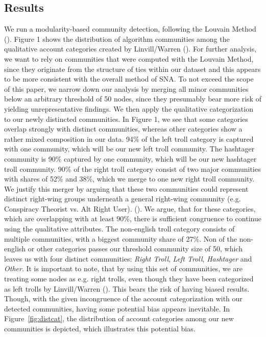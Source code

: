 \documentclass[12pt, titlepage=true, toc=bib]{scrartcl}
\begin{document}
\subsection{Results}

We run a modularity-based community detection, following the Louvain Method (\cite{blondel_fast_2008}). Figure 1 shows the distribution of algorithm communities among the qualitative account categories created by Linvill/Warren (\cite*{linvill_troll_2018}). For further analysis, we want to rely on communities that were computed with the Louvain Method, since they originate from the structure of ties within our dataset and this appears to be more consistent with the overall method of SNA. To not exceed the scope of this paper, we narrow down our analysis by merging all minor communities below an arbitrary threshold of 50 nodes, since they presumably bear more risk of yielding unrepresentative findings. We then apply the qualitative categorization to our newly distincted communities. In Figure 1, we see that some categories overlap strongly with distinct communities, whereas other categories show a rather mixed composition in our data. 94\% of the left troll category is captured with one community, which will be our new left troll community. The hashtager community is 90\% captured by one community, which will be our new hashtager troll community. 90\% of the right troll category consist of two major communities with shares of 52\% and 38\%, which we merge to one new right troll community. We justify this merger by arguing that these two communities could represent distinct right-wing groups underneath a general right-wing community (e.g. Conspiracy Theorist vs. Alt Right User). (\cite{kaiser_unite_2018}).  We argue, that for these categories, which are overlapping with at least 90\%, there is sufficient congruence to continue using the qualitative attributes. The non-english troll category consists of multiple communities, with a biggest community share of 27\%. Non of the non-english or other categories passes our threshold community size of 50, which leaves us with four distinct communities: \textit{Right Troll}, \textit{Left Troll}, \textit{Hashtager} and \textit{Other}. It is important to note, that by using this set of communities, we are treating some nodes as e.g. right trolls, even though they have been categorized as left trolls by Linvill/Warren (\cite*{linvill_troll_2018}). This bears the risk of having biased results. Though, with the given incongruence of the account categorization with our detected communities, having some potential bias appears inevitable. In Figure~\ref{fig:distcat}, the distribution of account categories among our new communities is depicted, which illustrates this potential bias.
\end{document}
